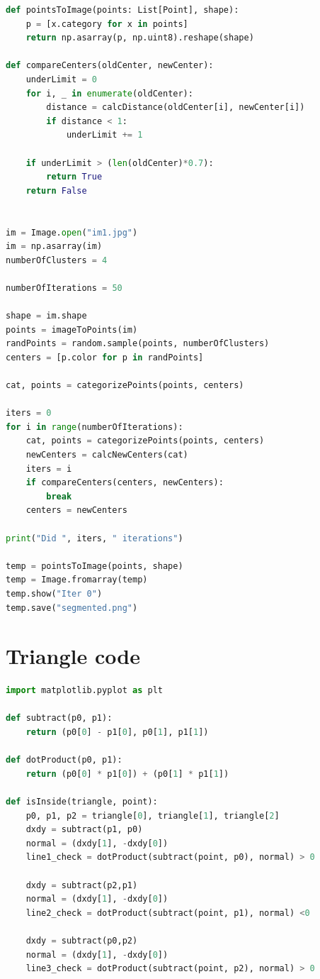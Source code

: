 \documentclass{article}
\begin{document}
\begin{appendices}
\begin{lstlisting}[language=python]
def pointsToImage(points: List[Point], shape):
    p = [x.category for x in points]
    return np.asarray(p, np.uint8).reshape(shape)

def compareCenters(oldCenter, newCenter):
    underLimit = 0
    for i, _ in enumerate(oldCenter):
        distance = calcDistance(oldCenter[i], newCenter[i])
        if distance < 1:
            underLimit += 1
    
    if underLimit > (len(oldCenter)*0.7):
        return True
    return False


im = Image.open("im1.jpg")
im = np.asarray(im)
numberOfClusters = 4

numberOfIterations = 50

shape = im.shape
points = imageToPoints(im)
randPoints = random.sample(points, numberOfClusters)
centers = [p.color for p in randPoints]

cat, points = categorizePoints(points, centers)

iters = 0
for i in range(numberOfIterations):
    cat, points = categorizePoints(points, centers)
    newCenters = calcNewCenters(cat)
    iters = i
    if compareCenters(centers, newCenters):
        break
    centers = newCenters

print("Did ", iters, " iterations")

temp = pointsToImage(points, shape)
temp = Image.fromarray(temp)
temp.show("Iter 0")
temp.save("segmented.png")        
        \end{lstlisting}
        \section{Triangle code}
        \label{appendix:tri}
        \begin{lstlisting}[language=python]
import matplotlib.pyplot as plt

def subtract(p0, p1):
    return (p0[0] - p1[0], p0[1], p1[1])

def dotProduct(p0, p1):
    return (p0[0] * p1[0]) + (p0[1] * p1[1])

def isInside(triangle, point):
    p0, p1, p2 = triangle[0], triangle[1], triangle[2]
    dxdy = subtract(p1, p0)
    normal = (dxdy[1], -dxdy[0])
    line1_check = dotProduct(subtract(point, p0), normal) > 0

    dxdy = subtract(p2,p1)
    normal = (dxdy[1], -dxdy[0])
    line2_check = dotProduct(subtract(point, p1), normal) <0

    dxdy = subtract(p0,p2)
    normal = (dxdy[1], -dxdy[0])
    line3_check = dotProduct(subtract(point, p2), normal) > 0


\end{lstlisting}
\end{appendices}
\end{document}
